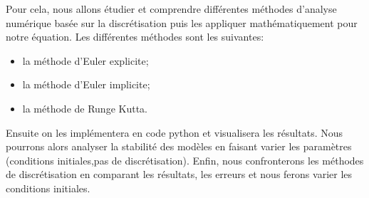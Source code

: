 Pour cela, nous allons étudier et comprendre différentes méthodes d'analyse numérique basée sur la discrétisation puis les appliquer mathématiquement pour notre équation.
\newline
Les différentes méthodes sont les suivantes:
\begin{itemize}
    \item la méthode d'Euler explicite;
    \item la méthode d'Euler implicite;
    \item la méthode de Runge Kutta.
\end{itemize}
Ensuite on les implémentera en code python et visualisera les résultats. Nous pourrons alors analyser la stabilité des modèles en faisant varier les paramètres (conditions initiales,pas de discrétisation). Enfin, nous confronterons les méthodes de discrétisation en comparant les résultats, les erreurs et nous ferons varier les conditions initiales.\\


